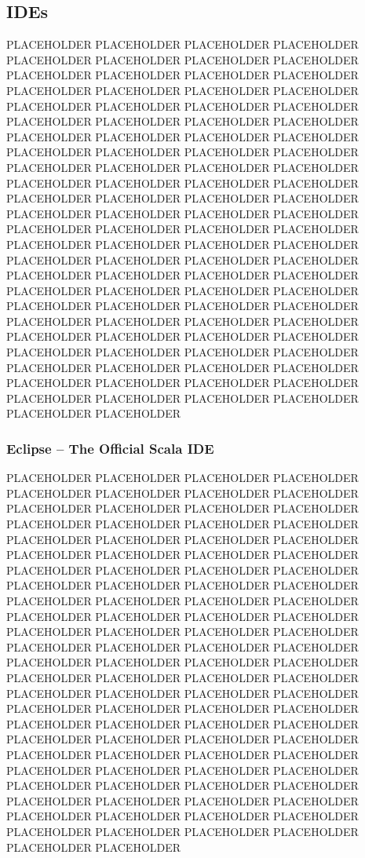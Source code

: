 \subsection{IDEs}

PLACEHOLDER PLACEHOLDER PLACEHOLDER PLACEHOLDER PLACEHOLDER PLACEHOLDER PLACEHOLDER PLACEHOLDER PLACEHOLDER PLACEHOLDER PLACEHOLDER PLACEHOLDER PLACEHOLDER PLACEHOLDER PLACEHOLDER PLACEHOLDER PLACEHOLDER PLACEHOLDER PLACEHOLDER PLACEHOLDER PLACEHOLDER PLACEHOLDER PLACEHOLDER PLACEHOLDER PLACEHOLDER PLACEHOLDER PLACEHOLDER PLACEHOLDER PLACEHOLDER PLACEHOLDER PLACEHOLDER PLACEHOLDER PLACEHOLDER PLACEHOLDER PLACEHOLDER PLACEHOLDER PLACEHOLDER PLACEHOLDER PLACEHOLDER PLACEHOLDER PLACEHOLDER PLACEHOLDER PLACEHOLDER PLACEHOLDER PLACEHOLDER PLACEHOLDER PLACEHOLDER PLACEHOLDER PLACEHOLDER PLACEHOLDER PLACEHOLDER PLACEHOLDER PLACEHOLDER PLACEHOLDER PLACEHOLDER PLACEHOLDER PLACEHOLDER PLACEHOLDER PLACEHOLDER PLACEHOLDER PLACEHOLDER PLACEHOLDER PLACEHOLDER PLACEHOLDER PLACEHOLDER PLACEHOLDER PLACEHOLDER PLACEHOLDER PLACEHOLDER PLACEHOLDER PLACEHOLDER PLACEHOLDER PLACEHOLDER PLACEHOLDER PLACEHOLDER PLACEHOLDER PLACEHOLDER PLACEHOLDER PLACEHOLDER PLACEHOLDER PLACEHOLDER PLACEHOLDER PLACEHOLDER PLACEHOLDER PLACEHOLDER PLACEHOLDER PLACEHOLDER PLACEHOLDER PLACEHOLDER PLACEHOLDER PLACEHOLDER PLACEHOLDER PLACEHOLDER PLACEHOLDER PLACEHOLDER PLACEHOLDER PLACEHOLDER PLACEHOLDER

\subsubsection{Eclipse -- The Official Scala IDE}

PLACEHOLDER PLACEHOLDER PLACEHOLDER PLACEHOLDER PLACEHOLDER PLACEHOLDER PLACEHOLDER PLACEHOLDER PLACEHOLDER PLACEHOLDER PLACEHOLDER PLACEHOLDER PLACEHOLDER PLACEHOLDER PLACEHOLDER PLACEHOLDER PLACEHOLDER PLACEHOLDER PLACEHOLDER PLACEHOLDER PLACEHOLDER PLACEHOLDER PLACEHOLDER PLACEHOLDER PLACEHOLDER PLACEHOLDER PLACEHOLDER PLACEHOLDER PLACEHOLDER PLACEHOLDER PLACEHOLDER PLACEHOLDER PLACEHOLDER PLACEHOLDER PLACEHOLDER PLACEHOLDER PLACEHOLDER PLACEHOLDER PLACEHOLDER PLACEHOLDER PLACEHOLDER PLACEHOLDER PLACEHOLDER PLACEHOLDER PLACEHOLDER PLACEHOLDER PLACEHOLDER PLACEHOLDER PLACEHOLDER PLACEHOLDER PLACEHOLDER PLACEHOLDER PLACEHOLDER PLACEHOLDER PLACEHOLDER PLACEHOLDER PLACEHOLDER PLACEHOLDER PLACEHOLDER PLACEHOLDER PLACEHOLDER PLACEHOLDER PLACEHOLDER PLACEHOLDER PLACEHOLDER PLACEHOLDER PLACEHOLDER PLACEHOLDER PLACEHOLDER PLACEHOLDER PLACEHOLDER PLACEHOLDER PLACEHOLDER PLACEHOLDER PLACEHOLDER PLACEHOLDER PLACEHOLDER PLACEHOLDER PLACEHOLDER PLACEHOLDER PLACEHOLDER PLACEHOLDER PLACEHOLDER PLACEHOLDER PLACEHOLDER PLACEHOLDER PLACEHOLDER PLACEHOLDER PLACEHOLDER PLACEHOLDER PLACEHOLDER PLACEHOLDER PLACEHOLDER PLACEHOLDER PLACEHOLDER PLACEHOLDER PLACEHOLDER PLACEHOLDER

